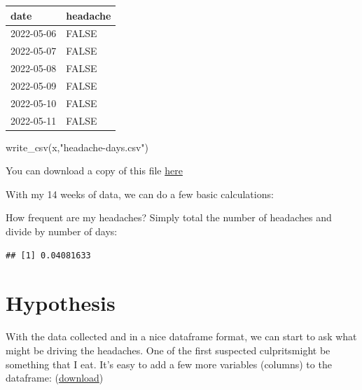 \documentclass[
]{book}
\newenvironment{Shaded}{\begin{snugshade}}{\end{snugshade}}
\newcommand{\CommentTok}[1]{\textcolor[rgb]{0.56,0.35,0.01}{\textit{#1}}}
\newcommand{\FunctionTok}[1]{\textcolor[rgb]{0.00,0.00,0.00}{#1}}
\newcommand{\NormalTok}[1]{#1}
\newcommand{\SpecialCharTok}[1]{\textcolor[rgb]{0.00,0.00,0.00}{#1}}
\newcommand{\StringTok}[1]{\textcolor[rgb]{0.31,0.60,0.02}{#1}}
\begin{document}
\begin{table}
\centering
\begin{tabular}{l|l}
\hline
date & headache\\
\hline
2022-05-06 & FALSE\\
\hline
2022-05-07 & FALSE\\
\hline
2022-05-08 & FALSE\\
\hline
2022-05-09 & FALSE\\
\hline
2022-05-10 & FALSE\\
\hline
2022-05-11 & FALSE\\
\hline
\end{tabular}
\end{table}

\begin{Shaded}
\begin{Highlighting}[]
\FunctionTok{write\_csv}\NormalTok{(x,}\StringTok{"headache{-}days.csv"}\NormalTok{)}
\end{Highlighting}
\end{Shaded}

You can download a copy of this file \href{./headache-days.csv}{here}

With my 14 weeks of data, we can do a few basic calculations:

How frequent are my headaches? Simply total the number of headaches and divide by number of days:

\begin{Shaded}
\end{Shaded}

\begin{verbatim}
## [1] 0.04081633
\end{verbatim}

\hypertarget{hypothesis}{%
\section{Hypothesis}\label{hypothesis}}

With the data collected and in a nice dataframe format, we can start to ask what might be driving the headaches. One of the first suspected culpritsmight be something that I eat. It's easy to add a few more variables (columns) to the dataframe: (\href{./headache-variables.csv}{download})
\end{document}
